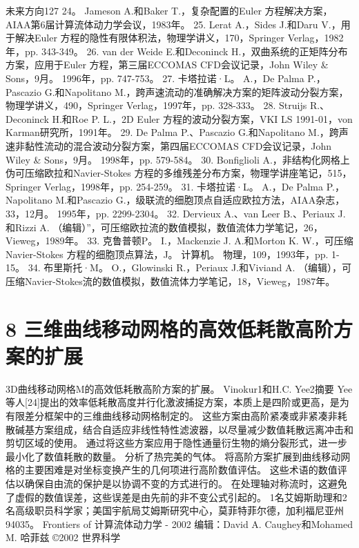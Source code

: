 \documentclass[UTF8,11pt,a4paper,openany,fontset=fandol]{ctexbook}
\begin{document}
未来方向127 24。 Jameson A.和Baker T.，复杂配置的Euler 方程解决方案，AIAA第6届计算流体动力学会议，1983年。 25. Lerat A.，Sides J.和Daru V.，用于解决Euler 方程的隐性有限体积法，物理学讲义，170，Springer Verlag，1982年，pp. 343-349。 26. van der Weide E.和Deconinck H.，双曲系统的正矩阵分布方案，应用于Euler 方程，第三届ECCOMAS CFD会议记录，John Wiley \& Sons，9月。 1996年，pp. 747-753。 27. 卡塔拉诺·L。 A.，De Palma P.，Pascazio G.和Napolitano M.，跨声速流动的准确解决方案的矩阵波动分裂方案，物理学讲义，490，Springer Verlag，1997年，pp. 328-333。 28. Struijs R.、Deconinck H.和Roe P. L.，2D Euler 方程的波动分裂方案，VKI LS 1991-01，von Karman研究所，1991年。 29. De Palma P.、Pascazio G.和Napolitano M.，跨声速非黏性流动的混合波动分裂方案，第四届ECCOMAS CFD会议记录，John Wiley \& Sons，9月。 1998年，pp. 579-584。 30. Bonfiglioli A.，非结构化网格上伪可压缩欧拉和Navier-Stokes 方程的多维残差分布方案，物理学讲座笔记，515，Springer Verlag，1998年，pp. 254-259。 31. 卡塔拉诺·L。 A.，De Palma P.，Napolitano M.和Pascazio G.，级联流的细胞顶点自适应欧拉方法，AIAA杂志，33，12月。 1995年，pp. 2299-2304。 32. Dervieux A.、van Leer B.、Periaux J.和Rizzi A. （编辑）”，可压缩欧拉流的数值模拟，数值流体力学笔记，26，Vieweg，1989年。 33. 克鲁普顿P。 I.，Mackenzie J. A.和Morton K. W.，可压缩Navier-Stokes 方程的细胞顶点算法，J。 计算机。 物理，109，1993年，pp. 1-15。 34. 布里斯托·M。 O.，Glowinski R.，Periaux J.和Viviand A. （编辑），可压缩Navier-Stokes流的数值模拟，数值流体力学笔记，18，Vieweg，1987年。

\clearpage
\chapter{8 三维曲线移动网格的高效低耗散高阶方案的扩展}
3D曲线移动网格M的高效低耗散高阶方案的扩展。 Vinokur1和H.C. Yee2摘要 Yee等人[24]提出的效率低耗散高度并行化激波捕捉方案，本质上是四阶或更高，是为有限差分框架中的三维曲线移动网格制定的。 这些方案由高阶紧凑或非紧凑非耗散碱基方案组成，结合自适应非线性特性滤波器，以尽量减少数值耗散远离冲击和剪切区域的使用。 通过将这些方案应用于隐性通量衍生物的熵分裂形式，进一步最小化了数值耗散的数量。 分析了热完美的气体。 将高阶方案扩展到曲线移动网格的主要困难是对坐标变换产生的几何项进行高阶数值评估。 这些术语的数值评估以确保自由流的保护是以协调不变的方式进行的。 在处理轴对称流时，这避免了虚假的数值误差，这些误差是由先前的非不变公式引起的。 1名艾姆斯助理和2名高级职员科学家；美国宇航局艾姆斯研究中心，莫菲特菲尔德，加利福尼亚州94035。 Frontiers of 计算流体动力学 - 2002 编辑：David A. Caughey和Mohamed M. 哈菲兹 ©2002 世界科学
\end{document}
